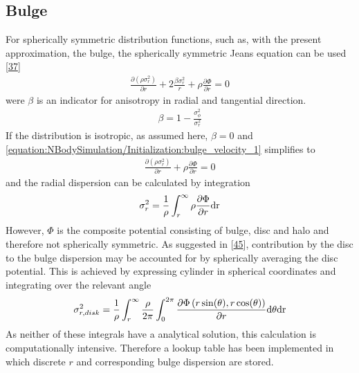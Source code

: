 \documentclass[letterpaper,10pt,english]{sphinxmanual}
\begin{document}
\subsection{Bulge}
\label{\detokenize{NBodySimulation/Initialization:bulge}}
\sphinxAtStartPar
For spherically symmetric distribution functions, such as, with the present approximation, the bulge, the spherically symmetric Jeans equation can be used {[}\hyperlink{cite.NBodySimulation/Appendix:id20}{37}{]}
\begin{equation}\label{equation:NBodySimulation/Initialization:bulge_velocity_1}
\begin{split}\frac{\partial (\rho \sigma_r^2)}{\partial r} + 2\frac{\beta\sigma_r^2}{r} + \rho\frac{\partial \Phi}{\partial r} = 0\end{split}
\end{equation}
\sphinxAtStartPar
were \(\beta\) is an indicator for anisotropy in radial and tangential direction.
\begin{equation*}
\begin{split}\beta = 1 - \frac{\sigma^2_\phi}{\sigma^2_r}\end{split}
\end{equation*}
\sphinxAtStartPar
If the distribution is isotropic, as assumed here, \(\beta=0\) and \eqref{equation:NBodySimulation/Initialization:bulge_velocity_1} simplifies to
\begin{equation*}
\begin{split}\frac{\partial (\rho \sigma_r^2)}{\partial r} +  \rho\frac{\partial \Phi}{\partial r} = 0\end{split}
\end{equation*}
\sphinxAtStartPar
and the radial dispersion can be calculated by integration
\begin{equation*}
\begin{split}\sigma_r^2 = \frac{1}{\rho}\int_{r}^{\infty}\rho \frac{\partial \Phi}{\partial r}\textup{dr}\end{split}
\end{equation*}
\sphinxAtStartPar
However, \(\Phi\) is the composite potential consisting of bulge, disc and halo and therefore not spherically symmetric. As suggested in {[}\hyperlink{cite.NBodySimulation/Appendix:id19}{45}{]}, contribution by the disc to the bulge dispersion may be accounted for by spherically averaging the disc potential.
This is achieved by expressing cylinder in spherical coordinates and integrating over the relevant angle
\begin{equation*}
\begin{split}\sigma_{r,disk}^2 = \frac{1}{\rho}\int_{r}^{\infty}
\frac{\rho }{2\pi}  \int_0^{2\pi} \frac{\partial \Phi\left ( r\sin(\theta ),r\cos(\theta ) \right )}{\partial r} \textup{d}\theta \textup{dr} \\\end{split}
\end{equation*}
\sphinxAtStartPar
As neither of these integrals have a analytical solution, this calculation is computationally intensive.
Therefore a lookup table has been implemented in which discrete \(r\) and corresponding bulge dispersion are stored.
\end{document}
